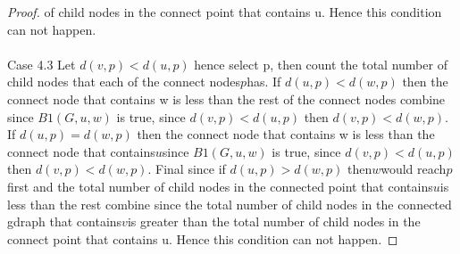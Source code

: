 \documentclass{article}
\begin{document}
\begin{proof}
of child nodes in the connect point that contains u. Hence this condition can not happen. 
\\\\
Case 4.3 Let \(d(v,p) < d(u,p)\) hence select p, then count the total number of child nodes 
that each of the connect nodes\(p\)has. If \(d(u,p) < d(w,p)\) then the connect node that contains 
w is less than the rest of the connect nodes combine since \(B1(G,u,w)\) is true, since \(d(v,p) < d(u,p)\)
then \(d(v,p) < d(w,p)\). If \(d(u,p) = d(w,p)\) then the connect node that contains 
w is less than the connect node that contains\(u\)since \(B1(G,u,w)\) is true, since \(d(v,p) < d(u,p)\) 
then \(d(v,p) < d(w,p)\). Final since if \(d(u,p) > d(w,p)\) then\(w\)would reach\(p\)first and 
the total number of child nodes in the connected point that contains\(u\)is less than the 
rest combine since the total number of child nodes in the connected gdraph that contains\(v\)is greater than the total number 
of child nodes in the connect point that contains u. Hence this condition can not happen. 
\end{proof}
\end{document}
